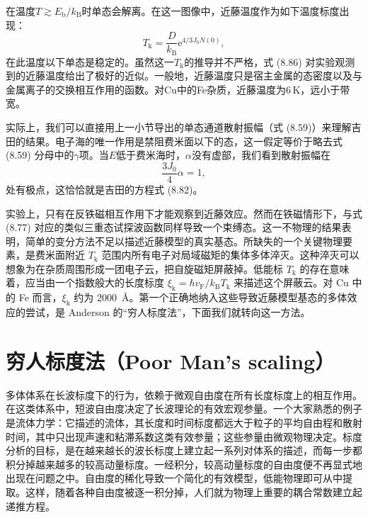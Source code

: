 在温度$T\gtrsim E_{\mathrm{b}}/k_{\mathrm{B}}$时单态会解离。在这一图像中，近藤温度作为如下温度标度出现：
\begin{equation*}
T_{\mathrm{k}} = \frac{D}{k_{\mathrm{B}}}\mathrm{e}^{4/3J_0N(0)},
\tag{8.86}
\end{equation*}
在此温度以下单态是稳定的。虽然这一$T_{\mathrm{k}}$的推导并不严格，式 (8.86) 对实验观测到的近藤温度给出了极好的近似。一般地，近藤温度只是宿主金属的态密度以及与金属离子的交换相互作用的函数。对Cu中的Fe杂质，近藤温度为$6\,\mathrm{K}$，远小于带宽。

实际上，我们可以直接用上一小节导出的单态通道散射振幅（式 (8.59)）来理解吉田的结果。电子海的唯一作用是禁阻费米面以下的态，这一假定等价于略去式 (8.59) 分母中的$\gamma$项。当$E$低于费米海时，$\alpha$没有虚部，我们看到散射振幅在
\begin{equation*}
\frac{3J_0}{4}\alpha = 1,
\tag{8.87}
\end{equation*}
处有极点，这恰恰就是吉田的方程式 (8.82)。

实验上，只有在反铁磁相互作用下才能观察到近藤效应。然而在铁磁情形下，与式 (8.77) 对应的类似三重态试探波函数同样导致一个束缚态。这一不物理的结果表明，简单的变分方法不足以描述近藤模型的真实基态。所缺失的一个关键物理要素，是费米面附近 $T_{\mathrm{k}}$ 范围内所有电子对局域磁矩的集体多体淬灭。这种淬灭可以想象为在杂质周围形成一团电子云，把自旋磁矩屏蔽掉。低能标 $T_{\mathrm{k}}$ 的存在意味着，应当由一个指数般大的长度标度 $\xi_{\mathrm{k}} = \hbar v_{\mathrm{F}} / k_{\mathrm{B}} T_{\mathrm{k}}$ 来描述这个屏蔽云。对 Cu 中的 Fe 而言，$\xi_{\mathrm{k}}$ 约为 2000~\AA{}。第一个正确地纳入这些导致近藤模型基态的多体效应的尝试，是 Anderson 的“穷人标度法”，下面我们就转向这一方法。

\section{穷人标度法（Poor Man's scaling）}

多体体系在长波标度下的行为，依赖于微观自由度在所有长度标度上的相互作用。在这类体系中，短波自由度决定了长波理论的有效宏观参量。一个大家熟悉的例子是流体力学：它描述的流体，其长度和时间标度都远大于粒子的平均自由程和散射时间，其中只出现声速和粘滞系数这类有效参量；这些参量由微观物理决定。标度分析的目标，是在越来越长的波长标度上建立起一系列对体系的描述，而每一步都积分掉越来越多的较高动量标度。一经积分，较高动量标度的自由度便不再显式地出现在问题之中。自由度的稀化导致一个简化的有效模型，低能物理即可从中提取。这样，随着各种自由度被逐一积分掉，人们就为物理上重要的耦合常数建立起递推方程。

